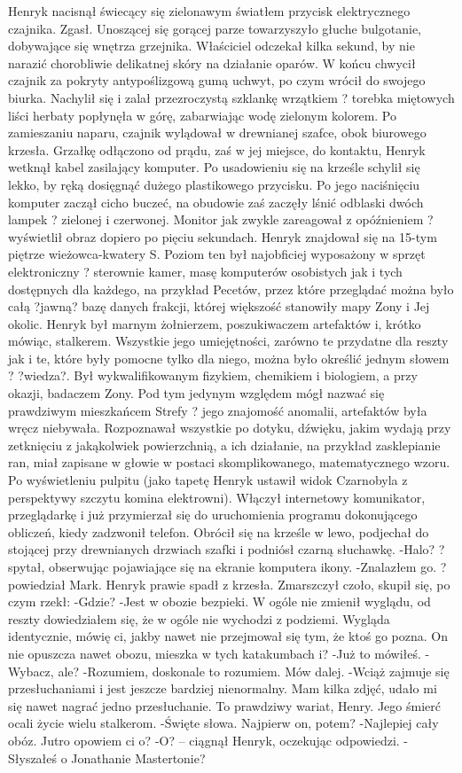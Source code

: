 \documentclass[../MAIN.tex]{subfiles}
\begin{document}
Henryk nacisnął świecący się zielonawym światłem przycisk elektrycznego czajnika. Zgasł.
Unoszącej się gorącej parze towarzyszyło głuche bulgotanie, dobywające się wnętrza grzejnika. Właściciel odczekał kilka sekund, by nie narazić chorobliwie delikatnej skóry na działanie oparów.
W końcu chwycił czajnik za pokryty antypoślizgową gumą uchwyt, po czym wrócił do swojego biurka. Nachylił się i zalał przezroczystą szklankę wrzątkiem ? torebka miętowych liści herbaty popłynęła w górę, zabarwiając wodę zielonym kolorem. Po zamieszaniu naparu, czajnik wylądował w drewnianej szafce, obok biurowego krzesła. Grzałkę odłączono od prądu, zaś w jej miejsce, do kontaktu, Henryk wetknął kabel zasilający komputer.
Po usadowieniu się na krześle schylił się lekko, by ręką dosięgnąć dużego plastikowego przycisku. Po jego naciśnięciu komputer zaczął cicho buczeć, na obudowie zaś zaczęły lśnić odblaski dwóch lampek ? zielonej i czerwonej.
Monitor jak zwykle zareagował z opóźnieniem ? wyświetlił obraz dopiero po pięciu sekundach.
Henryk znajdował się na 15-tym piętrze wieżowca-kwatery S. Poziom ten był najobficiej wyposażony w sprzęt elektroniczny ? sterownie kamer, masę komputerów osobistych jak i tych dostępnych dla każdego, na przykład Pecetów, przez które przeglądać można było całą ?jawną? bazę danych frakcji, której większość stanowiły mapy Zony i Jej okolic.
Henryk był marnym żołnierzem, poszukiwaczem artefaktów i, krótko mówiąc, stalkerem. Wszystkie jego umiejętności, zarówno te przydatne dla reszty jak i te, które były pomocne tylko dla niego, można było określić jednym słowem ? ?wiedza?.
Był wykwalifikowanym fizykiem, chemikiem i biologiem, a przy okazji, badaczem Zony. Pod tym jedynym względem mógł nazwać się prawdziwym mieszkańcem Strefy ? jego znajomość anomalii, artefaktów była wręcz niebywała. Rozpoznawał wszystkie po dotyku, dźwięku, jakim wydają przy zetknięciu z jakąkolwiek powierzchnią, a ich działanie, na przykład zasklepianie ran, miał zapisane w głowie w postaci skomplikowanego, matematycznego wzoru.
Po wyświetleniu pulpitu (jako tapetę Henryk ustawił widok Czarnobyla z perspektywy szczytu komina elektrowni). Włączył internetowy komunikator, przeglądarkę i już przymierzał się do uruchomienia programu dokonującego obliczeń, kiedy zadzwonił telefon.
Obrócił się na krześle w lewo, podjechał do stojącej przy drewnianych drzwiach szafki i podniósł czarną słuchawkę.
-Halo? ? spytał, obserwując pojawiające się na ekranie komputera ikony.
-Znalazłem go. ? powiedział Mark.
Henryk prawie spadł z krzesła. Zmarszczył czoło, skupił się, po czym rzekł:
-Gdzie?
-Jest w obozie bezpieki. W ogóle nie zmienił wyglądu, od reszty dowiedziałem się, że w ogóle nie wychodzi z podziemi. Wygląda identycznie, mówię ci, jakby nawet nie przejmował się tym, że ktoś go pozna. On nie opuszcza nawet obozu, mieszka w tych katakumbach i?
-Już to mówiłeś.
-Wybacz, ale?
-Rozumiem, doskonale to rozumiem. Mów dalej.
-Wciąż zajmuje się przesłuchaniami i jest jeszcze bardziej nienormalny. Mam kilka zdjęć, udało mi się nawet nagrać jedno przesłuchanie. To prawdziwy wariat, Henry. Jego śmierć ocali życie wielu stalkerom.
-Święte słowa. Najpierw on, potem?
-Najlepiej cały obóz. Jutro opowiem ci o?
-O? -- ciągnął Henryk, oczekując odpowiedzi.
-Słyszałeś o Jonathanie Mastertonie?
\end{document}
